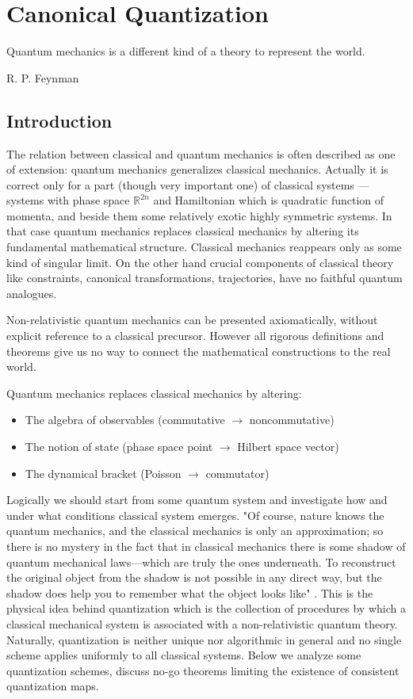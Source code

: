 \chapter{Canonical Quantization}
\label{cq}
{
    \setlength{}
\epigraph{ Quantum mechanics is a
different kind of a theory to represent the world.
} {R. P. Feynman}
}
\section{Introduction}
The relation between classical and quantum mechanics is often
described as one of extension: quantum mechanics generalizes
classical mechanics. Actually it is correct only for a
part (though very important one) of classical
 systems ---  systems with phase space $ \mathbb{R}^{2 n} $
 and  Hamiltonian which is quadratic function of momenta,
 and beside them some relatively exotic highly symmetric systems. 
 In that case quantum mechanics
replaces classical mechanics by altering its fundamental
mathematical structure. Classical mechanics reappears only 
as some kind of  singular limit.
On the other hand  crucial components of classical theory 
like constraints, canonical transformations, trajectories,
have no faithful quantum analogues.

Non-relativistic quantum mechanics can be presented axiomatically,
without explicit reference to a classical precursor. 
However all rigorous definitions and theorems give us no way to connect 
the mathematical constructions to the real world. 

Quantum mechanics replaces classical mechanics by altering:
\begin{itemize}
\item The algebra of observables (commutative $\to$ noncommutative)
\item The notion of state (phase space point $\to$ Hilbert space vector)
\item The dynamical bracket (Poisson $\to$ commutator)
\end{itemize}
Logically we should start from some quantum system and 
investigate how and under what conditions classical system emerges.  
"Of course, nature knows the quantum mechanics,
and the classical mechanics is only an approximation; so there is no mystery in
the fact that in classical mechanics there is some shadow of quantum mechanical
laws---which are truly the ones underneath. To reconstruct the original object
from the shadow is not possible in any direct way, but the shadow does help
you to remember what the object looks like" \cite{flp3}. 
This is the physical idea behind quantization which
is the collection of procedures by which a classical mechanical 
system is associated with a non-relativistic quantum theory. 
Naturally, quantization is neither unique nor algorithmic in general 
and no single scheme applies uniformly to all classical systems.
Below  we analyze some quantization schemes, 
discuss no-go theorems limiting the existence of consistent quantization maps.

